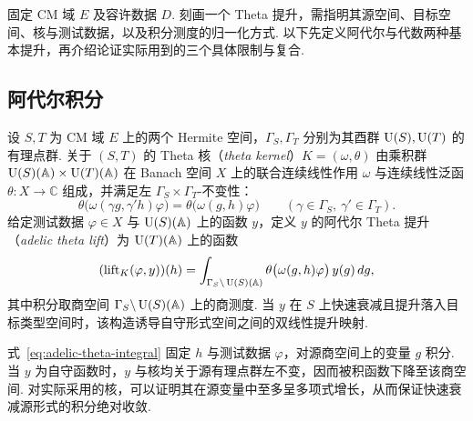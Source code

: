 固定 CM 域 $E$ 及容许数据 $D$. 刻画一个 Theta 提升，需指明其源空间、目标空间、核与测试数据，以及积分测度的归一化方式. 以下先定义阿代尔与代数两种基本提升，再介绍论证实际用到的三个具体限制与复合.

\subsection{阿代尔积分}

\begin{definition}
\label{def:adelic-theta-lift}
\emitthmsource
设 $S,T$ 为 CM 域 $E$ 上的两个 Hermite 空间，$\Gamma_S,\Gamma_T$ 分别为其酉群 $\operatorname{U}(S),\operatorname{U}(T)$ 的有理点群.
关于 $(S,T)$ 的 Theta 核（\emph{theta kernel}）$K=(\omega,\theta)$ 由乘积群 $\operatorname{U}(S)(\mathbb A)\times \operatorname{U}(T)(\mathbb A)$ 在 Banach 空间 $X$ 上的联合连续线性作用 $\omega$ 与连续线性泛函 $\theta\colon X\to\mathbb C$ 组成，并满足左 $\Gamma_S\times\Gamma_T$-不变性：
\[
 \theta\bigl(\omega(\gamma g,\gamma' h)\varphi\bigr)=\theta\bigl(\omega(g,h)\varphi\bigr)
 \qquad (\gamma\in\Gamma_S,\ \gamma'\in\Gamma_T).
\]
给定测试数据 $\varphi\in X$ 与 $\operatorname{U}(S)(\mathbb A)$ 上的函数 $y$，定义 $y$ 的阿代尔 Theta 提升（\emph{adelic theta lift}）为 $\operatorname{U}(T)(\mathbb A)$ 上的函数
\begin{equation}
 (\operatorname{lift}_K(\varphi,y))(h)
 =\int_{\Gamma_S\backslash \operatorname{U}(S)(\mathbb A)}
   \theta\bigl(\omega(g,h)\varphi\bigr)\,y(g)\,dg ,
\label{eq:adelic-theta-integral}
\end{equation}
其中积分取商空间 $\Gamma_S\backslash \operatorname{U}(S)(\mathbb A)$ 上的商测度. 当 $y$ 在 $S$ 上快速衰减且提升落入目标类型空间时，该构造诱导自守形式空间之间的双线性提升映射.
\end{definition}

式~\eqref{eq:adelic-theta-integral} 固定 $h$ 与测试数据 $\varphi$，对源商空间上的变量 $g$ 积分. 当 $y$ 为自守函数时，$y$ 与核均关于源有理点群左不变，因而被积函数下降至该商空间. 对实际采用的核，可以证明其在源变量中至多呈多项式增长，从而保证快速衰减源形式的积分绝对收敛.

